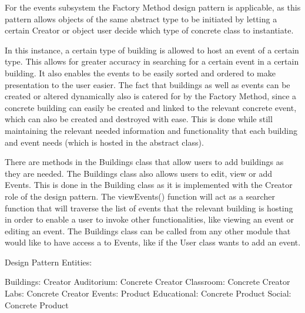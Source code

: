 \documentclass{article}
\begin{document}
    
    \begin{flushleft}
    
        For the events subsystem the Factory Method design pattern is applicable, as this pattern allows objects of the same abstract type to be initiated by letting a certain Creator or object user decide which type of concrete class to instantiate.
        
        \bigskip
        
        In this instance, a certain type of building is allowed to host an event of a certain type. This allows for greater accuracy in searching for a certain event in a certain building. It also enables the events to be easily sorted and ordered to make presentation to the user easier. The fact that buildings as well as events can be created or altered dynamically also is catered for by the Factory Method, since a concrete building can easily be created and linked to the relevant concrete event, which can also be created and destroyed with ease. This is done while still maintaining the relevant needed information and functionality that each building and event needs (which is hosted in the abstract class).
        
        \bigskip
        
        There are methods in the Buildings class that allow users to add buildings as they are needed. The Buildings class also allows users to edit, view or add Events. This is done in the Building class as it is implemented with the Creator role of the design pattern. The viewEvents() function will act as a searcher function that will traverse the list of events that the relevant building is hosting in order to enable a user to invoke other functionalities, like  viewing an event or editing an event. The Buildings class can be called from any other module that would like to have access a to Events, like if the User class wants to add an event.
        
        \bigskip
        Design Pattern Entities:
        \bigskip
        
        Buildings: Creator
        \newline
        Auditorium: Concrete Creator
        \newline
        Classroom: Concrete Creator
        \newline
        Labs: Concrete Creator
        \newline
        Events: Product
        \newline
        Educational: Concrete Product
        \newline
        Social: Concrete Product
    
    \end{flushleft}
    
\end{document}
